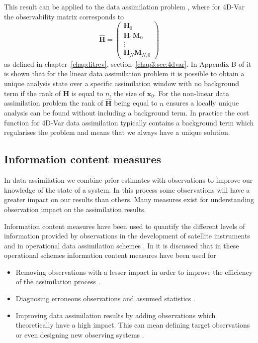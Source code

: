 This result can be applied to the data assimilation problem \citep{johnson2005singular}, where for 4D-Var the observability matrix corresponds to
\begin{equation}
\hat{\mathbf{H}}=
\begin{pmatrix}
\mathbf{H}_0 \\
\mathbf{H}_1\mathbf{M}_0\\
\vdots \\
\mathbf{H}_N\mathbf{M}_{N,0}
\end{pmatrix} \label{chap5:eqn: hmat}
\end{equation}
as defined in chapter~\ref{chap:litrev}, section~\ref{chap3:sec:4dvar}. In Appendix B of \citet{zou1992incomplete} it is shown that for the linear data assimilation problem it is possible to obtain a unique analysis state over a specific assimilation window with no background term if the rank of $\hat{\textbf{H}}$ is equal to $n$, the size of $\textbf{x}_0$. For the non-linear data assimilation problem the rank of $\hat{\textbf{H}}$ being equal to $n$ ensures a locally unique analysis can be found without including a background term. In practice the cost function for 4D-Var data assimilation typically contains a background term which regularises the problem and means that we always have a unique solution.

\subsection{Information content measures} \label{chap5:sec:IC}%

In data assimilation we combine prior estimates with observations to improve our knowledge of the state of a system. In this process some observations will have a greater impact on our results than others. Many measures exist for understanding observation impact on the assimilation results.

Information content measures have been used to quantify the different levels of information provided by observations in the development of satellite instruments \citep{stewart2008correlated, engelen2004information} and in operational data assimilation schemes \citep{fisher2003estimation, singh2013practical}. In \citet{Fowler2013} it is discussed that in these operational schemes information content measures have been used for
\begin{itemize}
\item Removing observations with a lesser impact in order to improve the efficiency of the assimilation process \citep{rabier2002channel, singh2013practical, rodgers1998information}.
\item Diagnosing erroneous observations and assumed statistics \citep{desroziers2009posteriori}.
\item Improving data assimilation results by adding observations which theoretically have a high impact. This can mean defining target observations \citep{palmer1998singular} or even designing new observing systems \citep{wahba1985design, eyre1990information}. 
\end{itemize}

